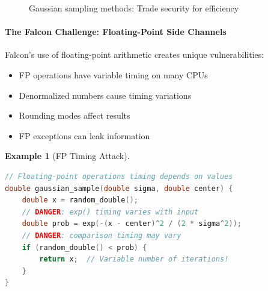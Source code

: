 \documentclass[11pt,a4paper]{article}
\newtheorem{example}{Example}
\begin{document}
\begin{figure}[h]
\centering
{}
\caption{Gaussian sampling methods: Trade security for efficiency}
\end{figure}

\paragraph{The Falcon Challenge: Floating-Point Side Channels}

Falcon's use of floating-point arithmetic creates unique vulnerabilities:

\begin{itemize}
    \item FP operations have variable timing on many CPUs
    \item Denormalized numbers cause timing variations
    \item Rounding modes affect results
    \item FP exceptions can leak information
\end{itemize}

\begin{example}[FP Timing Attack]
\begin{lstlisting}[language=C]
// Floating-point operations timing depends on values
double gaussian_sample(double sigma, double center) {
    double x = random_double();
    // DANGER: exp() timing varies with input
    double prob = exp(-(x - center)^2 / (2 * sigma^2));
    // DANGER: comparison timing may vary
    if (random_double() < prob) {
        return x;  // Variable number of iterations!
    }
}
\end{lstlisting}
\end{example}
\end{document}
